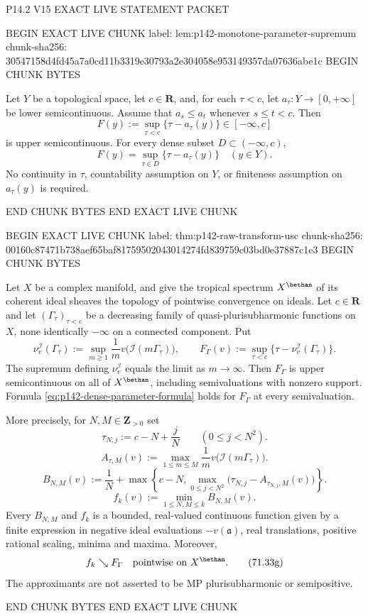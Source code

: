 P14.2 V15 EXACT LIVE STATEMENT PACKET

BEGIN EXACT LIVE CHUNK
label: lem:p142-monotone-parameter-supremum
chunk-sha256: 30547158d4fd45a7a0cd11b3319e30793a2e304058e953149357da07636abe1c
BEGIN CHUNK BYTES
\begin{lemma}\label{lem:p142-monotone-parameter-supremum}
Let $Y$ be a topological space, let $c\in\mathbf R$, and, for each
$\tau<c$, let $a_\tau:Y\to[0,+\infty]$ be lower semicontinuous.
Assume that $a_s\leq a_t$ whenever $s\leq t<c$. Then
\[
 F(y):=\sup_{\tau<c}\{\tau-a_\tau(y)\}
 \in[-\infty,c]
\]
is upper semicontinuous. For every dense subset $D\subset(-\infty,c)$,
\[
 F(y)=\sup_{\tau\in D}\{\tau-a_\tau(y)\}
 \quad(y\in Y).
 \tag{71.33a}
 \label{eq:p142-dense-parameter-formula}
\]
No continuity in $\tau$, countability assumption on $Y$, or finiteness
assumption on $a_\tau(y)$ is required.
\end{lemma}
END CHUNK BYTES
END EXACT LIVE CHUNK

BEGIN EXACT LIVE CHUNK
label: thm:p142-raw-transform-usc
chunk-sha256: 00160c87471b738aef65baf81759502043014274fd839759c03bd0e37887c1e3
BEGIN CHUNK BYTES
\begin{theorem}\label{thm:p142-raw-transform-usc}
Let $X$ be a complex manifold, and give the tropical spectrum
$X^{\bethan}$ of its coherent ideal sheaves the topology of pointwise
convergence on ideals. Let $c\in\mathbf R$ and let
$(\Gamma_\tau)_{\tau<c}$ be a
decreasing family of quasi-plurisubharmonic functions on $X$, none
identically $-\infty$ on a connected component. Put
\[
 \nu_v^{\mathcal I}(\Gamma_\tau)
 :=\sup_{m\geq1}\frac1m v\bigl(\mathcal I(m\Gamma_\tau)\bigr),
 \qquad
 F_\Gamma(v):=\sup_{\tau<c}
       \{\tau-\nu_v^{\mathcal I}(\Gamma_\tau)\}.
 \tag{71.33b}
 \label{eq:p142-raw-transform}
\]
The supremum defining $\nu_v^{\mathcal I}$ equals the limit as
$m\to\infty$. Then $F_\Gamma$ is upper semicontinuous on all of
$X^{\bethan}$, including semivaluations with nonzero support. Formula
\eqref{eq:p142-dense-parameter-formula} holds for $F_\Gamma$ at every
semivaluation.

More precisely, for $N,M\in\mathbf Z_{>0}$ set
\[
 \tau_{N,j}:=c-N+\frac jN \qquad(0\leq j<N^2).
 \tag{71.33c}
 \label{eq:p142-mesh}
\]
\[
 A_{\tau,M}(v):=\max_{1\leq m\leq M}
       \frac1m v\bigl(\mathcal I(m\Gamma_\tau)\bigr).
 \tag{71.33d}
 \label{eq:p142-finite-ideal-values}
\]
\[
 B_{N,M}(v):=\frac1N+
   \max\left\{c-N,
       \max_{0\leq j<N^2}
        \bigl(\tau_{N,j}-A_{\tau_{N,j},M}(v)\bigr)\right\}.
 \tag{71.33e}
 \label{eq:p142-upper-approximants}
\]
\[
 f_k(v):=\min_{1\leq N,M\leq k}B_{N,M}(v).
 \tag{71.33f}
 \label{eq:p142-decreasing-sequence}
\]
Every $B_{N,M}$ and $f_k$ is a bounded, real-valued continuous function
given by a finite expression in negative ideal evaluations $-v(\mathfrak a)$,
real translations, positive rational scaling, minima and maxima. Moreover,
\[
 f_k\searrow F_\Gamma\quad\hbox{pointwise on }X^{\bethan}.
 \tag{71.33g}
 \label{eq:p142-exact-sequential-limit}
\]
The approximants are not asserted to be MP plurisubharmonic or
semipositive.
\end{theorem}
END CHUNK BYTES
END EXACT LIVE CHUNK


